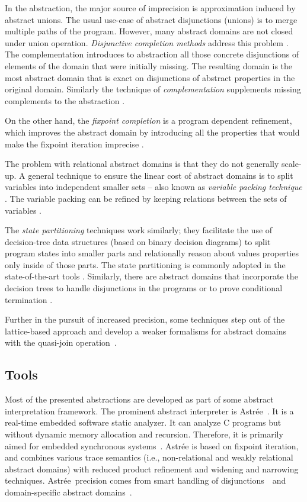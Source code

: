 In the abstraction, the major source of imprecision is approximation induced by
abstract unions. The usual use-case of abstract disjunctions (unions) is to
merge multiple paths of the program. However, many abstract domains are not
closed under union operation.  \emph{Disjunctive completion methods} address
this problem \cite{File1999}. The complementation introduces to abstraction all
those concrete disjunctions of elements of the domain that were initially
missing.  The resulting domain is the most abstract domain that is exact on
disjunctions of abstract properties in the original domain. Similarly the technique
of \emph{complementation} supplements missing complements to the abstraction
\cite{Cortesi1995}.

On the other hand, the \emph{fixpoint completion} is a program dependent refinement,
which improves the abstract domain by introducing all the properties that
would make the fixpoint iteration imprecise \cite{Giacobazzi2000,
Giacobazzi2001}.

The problem with relational abstract domains is that they do not generally
scale-up. A general technique to ensure the linear cost of abstract domains is
to split variables into independent smaller sets -- also known as \emph{variable
packing technique} \cite{Mine2006}. The variable packing can be refined by
keeping relations between the sets of variables \cite{Bouzaziz2012}.

The \emph{state partitioning} techniques \cite{Muchnick1981} work similarly;
they facilitate the use of decision-tree data structures (based on binary
decision diagrams) to split program states into smaller parts and relationally
reason about values properties only inside of those parts. The state
partitioning is commonly adopted in the state-of-the-art tools
\cite{Cousot2010, Bertrane2015}. Similarly, there are abstract domains that
incorporate the decision trees to handle disjunctions in the programs
\cite{Cousot2010a} or to prove conditional termination \cite{Urban2010}.

Further in the pursuit of increased precision, some techniques step out of the
lattice-based approach and develop a weaker formalisms for abstract domains with
the quasi-join ope\-ra\-tion~\cite{Gange2013}.

\subsection{Tools}

Most of the presented abstractions are developed as part of some abstract
interpretation framework. The prominent abstract interpreter is
Astrée~\cite{Astree}. It is a real-time embedded software static analyzer. It
can analyze C programs but without dynamic memory allocation and recursion.
Therefore, it is primarily aimed for embedded synchronous
systems~\cite{Delmas2007, Souyris2007, Bouissou2009, Bertrane2015}.  Astrée is
based on fixpoint iteration, and combines various trace semantics (i.e.,
non-relational and weakly relational abstract domains) with reduced product
refinement and widening and narrowing techniques. Astrée precision comes from
smart handling of disjunctions~\cite{Blanchet2003, Mauborgne2005} and
domain-specific abstract domains~\cite{Feret2004, Feret2005}.

